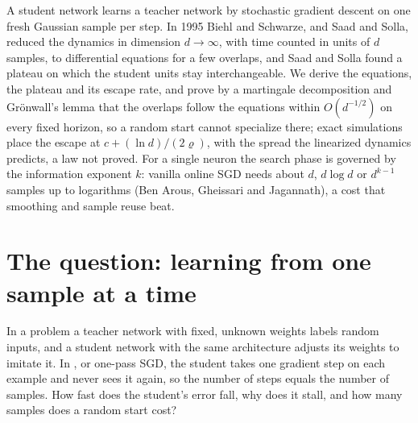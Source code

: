 \begin{refsection}

\newcommand{\sgdeg}{\varepsilon_{\mathrm g}}
\newcommand{\sgdsym}{\mathrm{sym}}
\newcommand{\sgdHe}{\mathrm{He}}
\newcommand{\sgdesc}{t_{\mathrm{esc}}}
\newcommand{\sgdPi}{\Pi_B}
\newcommand{\sgdK}{\mathcal K}

\begin{chaptersummary}
A student network learns a teacher network by stochastic gradient descent on one fresh Gaussian sample per step. In 1995 Biehl and Schwarze, and Saad and Solla, reduced the dynamics in dimension $d\to\infty$, with time counted in units of $d$ samples, to differential equations for a few overlaps, and Saad and Solla found a plateau on which the student units stay interchangeable. We derive the equations, the plateau and its escape rate, and prove by a martingale decomposition and Grönwall's lemma that the overlaps follow the equations within $O(d^{-1/2})$ on every fixed horizon, so a random start cannot specialize there; exact simulations place the escape at $c+(\ln d)/(2\varrho)$, with the spread the linearized dynamics predicts, a law not proved. For a single neuron the search phase is governed by the information exponent $k$: vanilla online SGD needs about $d$, $d\log d$ or $d^{k-1}$ samples up to logarithms (Ben Arous, Gheissari and Jagannath), a cost that smoothing and sample reuse beat.
\end{chaptersummary}

\section{The question: learning from one sample at a time}\label{sec:sgd:question}

In a  problem a teacher network with fixed, unknown weights labels random inputs, and a student network with the same architecture adjusts its weights to imitate it. In , or one-pass SGD, the student takes one gradient step on each example and never sees it again, so the number of steps equals the number of samples. How fast does the student's error fall, why does it stall, and how many samples does a random start cost?


\end{refsection}
